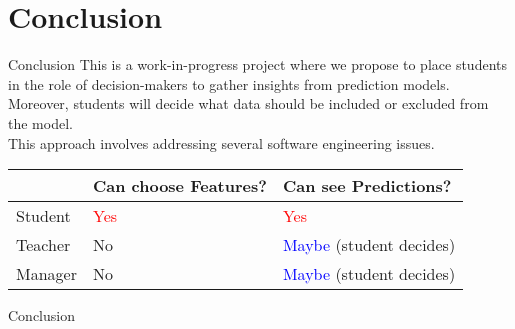 \section{Conclusion}

\begin{frame}{Conclusion}
    This is a work-in-progress project where we propose to place students in the role of 
    decision-makers to gather insights from prediction models. 
    \\
    Moreover, students will decide what data should be included or excluded from the model.
    \\
    This approach involves addressing several software engineering issues.

    \begin{table}[]
        \begin{tabular}{|l|l|l|} \hline
                 & Can choose Features?  & Can see Predictions?                    \\ \hline
         Student & \textcolor{red}{Yes}  & \textcolor{red}{Yes}                    \\ \hline
         Teacher & No                    & \textcolor{blue}{Maybe} (student decides) \\ \hline
         Manager & No                    & \textcolor{blue}{Maybe} (student decides) \\ \hline
        \end{tabular}
    \end{table}
\end{frame}


\begin{frame}{Conclusion}
\end{frame}


